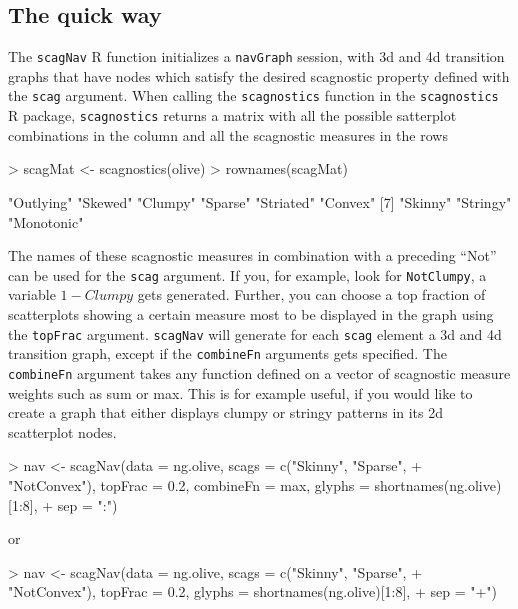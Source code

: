 \documentclass[12pt,oneside,titlepage,letter]{article}
\begin{document}
\subsection{The quick way}
The \texttt{scagNav} R function initializes a \texttt{navGraph} session, with 3d and 4d transition graphs that have nodes which satisfy the desired scagnostic property defined with the \texttt{scag} argument. When calling the \texttt{scagnostics} function in the \texttt{scagnostics} R package, \texttt{scagnostics} returns a matrix with all the possible satterplot combinations in the column and all the scagnostic measures in the rows
\begin{Schunk}
\begin{Sinput}
> scagMat <- scagnostics(olive)
> rownames(scagMat)
\end{Sinput}
\begin{Soutput}
[1] "Outlying"  "Skewed"    "Clumpy"    "Sparse"    "Striated"  "Convex"   
[7] "Skinny"    "Stringy"   "Monotonic"
\end{Soutput}
\end{Schunk}

The names of these scagnostic measures in combination with a preceding ``Not'' can be used for the \texttt{scag} argument. If you, for example, look for \texttt{NotClumpy}, a variable $1-Clumpy$ gets generated. Further, you can choose a top fraction of scatterplots showing a certain measure most to be displayed in the graph using the \texttt{topFrac} argument. \texttt{scagNav} will generate for each \texttt{scag} element a 3d and 4d transition graph, except if the \texttt{combineFn} arguments gets specified. The \texttt{combineFn} argument takes any function defined on a vector of scagnostic measure weights such as sum or max. This is for example useful, if you would like to create a graph that either displays clumpy or stringy patterns in its 2d scatterplot nodes.

\begin{Schunk}
\begin{Sinput}
> nav <- scagNav(data = ng.olive, scags = c("Skinny", "Sparse", 
+     "NotConvex"), topFrac = 0.2, combineFn = max, glyphs = shortnames(ng.olive)[1:8], 
+     sep = ":")
\end{Sinput}
\end{Schunk}

or

\begin{Schunk}
\begin{Sinput}
> nav <- scagNav(data = ng.olive, scags = c("Skinny", "Sparse", 
+     "NotConvex"), topFrac = 0.2, glyphs = shortnames(ng.olive)[1:8], 
+     sep = "+")
\end{Sinput}
\end{Schunk}
\end{document}
